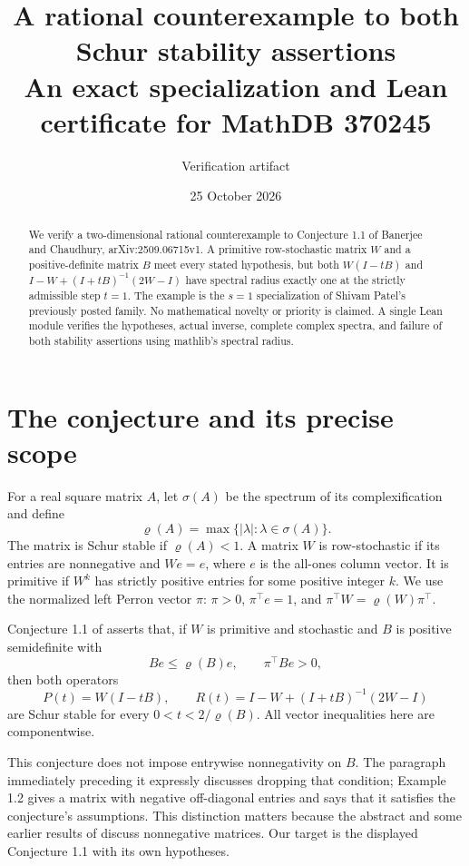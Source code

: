 \documentclass[11pt]{article}
\title{A rational counterexample to both Schur stability assertions\\
\large An exact specialization and Lean certificate for MathDB 370245}
\author{Verification artifact}
\date{25 October 2026}
\newcommand{\rhoo}{\varrho}
\begin{document}
\maketitle
\begin{abstract}
We verify a two-dimensional rational counterexample to Conjecture 1.1 of
Banerjee and Chaudhury, arXiv:2509.06715v1. A primitive row-stochastic matrix
$W$ and a positive-definite matrix $B$ meet every stated hypothesis, but both
$W(I-tB)$ and $I-W+(I+tB)^{-1}(2W-I)$ have spectral radius exactly one at
the strictly admissible step $t=1$. The example is the $s=1$ specialization
of Shivam Patel's previously posted family. No mathematical novelty or
priority is claimed. A single Lean module verifies the hypotheses, actual
inverse, complete complex spectra, and failure of both stability assertions
using mathlib's spectral radius.
\end{abstract}

\section{The conjecture and its precise scope}
For a real square matrix $A$, let $\sigma(A)$ be the spectrum of its
complexification and define
\[
 \rhoo(A)=\max\{|\lambda|:\lambda\in\sigma(A)\}.
\]
The matrix is Schur stable if $\rhoo(A)<1$. A matrix $W$ is row-stochastic
if its entries are nonnegative and $We=e$, where $e$ is the all-ones column
vector. It is primitive if $W^k$ has strictly positive entries for some
positive integer $k$. We use the normalized left Perron vector $\pi$:
$\pi>0$, $\pi^\top e=1$, and
$\pi^\top W=\rhoo(W)\pi^\top$.

Conjecture 1.1 of \cite{BC} asserts that, if $W$ is primitive and stochastic
and $B$ is positive semidefinite with
\begin{equation}\label{eq:hyp}
 Be\leq\rhoo(B)e,\qquad \pi^\top Be>0,
\end{equation}
then both operators
\begin{equation}\label{eq:operators}
 P(t)=W(I-tB),\qquad R(t)=I-W+(I+tB)^{-1}(2W-I)
\end{equation}
are Schur stable for every $0<t<2/\rhoo(B)$.
All vector inequalities here are componentwise.

This conjecture does not impose entrywise nonnegativity on $B$.
The paragraph immediately preceding it expressly discusses dropping that
condition; Example 1.2 gives a matrix with negative off-diagonal entries
and says that it satisfies the conjecture's assumptions. This distinction
matters because the abstract and some earlier results of \cite{BC} discuss
nonnegative matrices. Our target is the displayed Conjecture 1.1 with its
own hypotheses.
\end{document}
